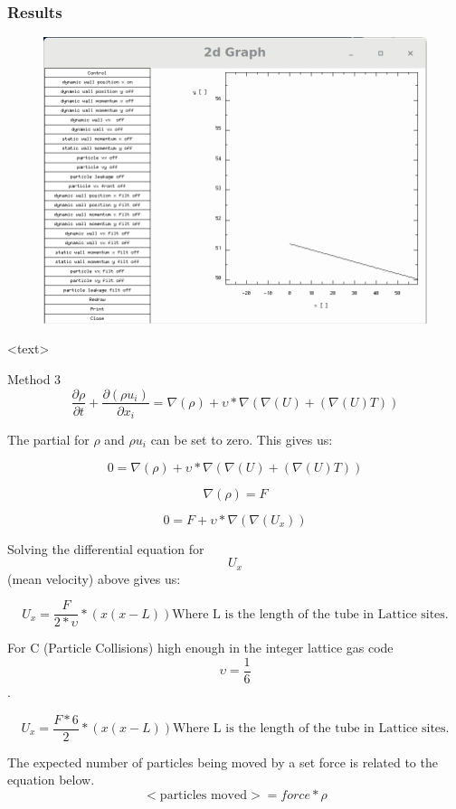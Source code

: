 \documentclass{beamer}
\begin{document}
\begin{frame}
\frametitle{Results}
\begin{figure}
\includegraphics[scale=0.2]{A11p4}
\caption{}
\end{figure}
<text>
\end{frame}

\begin{frame}{Method 3}
\begin{equation}
\frac{\partial \rho}{\partial t} + \frac{\partial(\rho u_{i})}{\partial x_{i}} = \nabla(\rho) + \upsilon *\nabla(\nabla(U)+(\nabla(U)T))
\end{equation}

The partial for $\rho$ and $\rho u_{i}$ can be set to zero.
This gives us:

\begin{equation}
0 = \nabla(\rho) + \upsilon *\nabla(\nabla(U)+(\nabla(U)T))
\end{equation}


$$ \nabla(\rho) = F$$ 

\begin{equation}
0 = F + \upsilon *\nabla(\nabla(U_x))
\end{equation}

Solving the differential equation for $$U_x$$ (mean velocity) above gives us:

\begin{equation}
U_x =\frac{F}{2*\upsilon}*(x(x-L)) \textrm{Where L is the length of the tube in Lattice sites.}
\end{equation}

For C (Particle Collisions) high enough in the integer lattice gas code $$\upsilon = \frac{1}{6}$$.

\begin{equation}
U_x =\frac{F*6}{2}*(x(x-L)) \textrm{Where L is the length of the tube in Lattice sites.}
\end{equation}

The expected number of particles being moved by a set force is related to the equation below.  
\begin{equation}
<\textrm{particles moved}> = force*\rho
\end{equation}
\end{frame}
\end{document}
